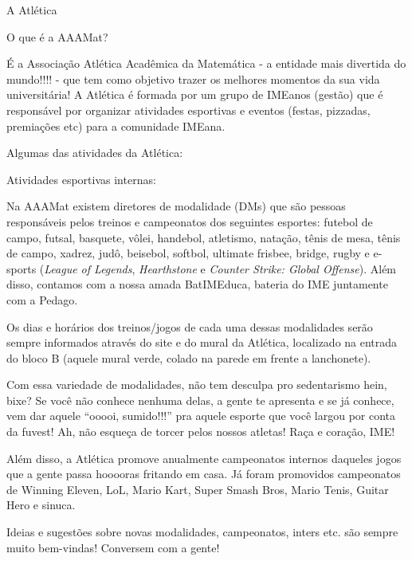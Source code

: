 \begin{secao}{A Atlética} %

\begin{subsecao}{O que é a AAAMat?}

É a Associação Atlética Acadêmica da Matemática - a entidade mais divertida do
mundo!!!! - que tem como objetivo trazer os melhores momentos da sua vida
universitária! A Atlética é formada por um grupo de IMEanos (gestão) que é
responsável por organizar atividades esportivas e eventos (festas, pizzadas,
premiações etc) para a comunidade IMEana.

\end{subsecao}

Algumas das atividades da Atlética:

\begin{subsecao}{Atividades esportivas internas:}

Na AAAMat existem diretores de modalidade (DMs) que são pessoas responsáveis
pelos treinos e campeonatos dos seguintes esportes: futebol de campo, futsal,
basquete, vôlei, handebol, atletismo, natação, tênis de mesa, tênis de campo,
xadrez, judô, beisebol, softbol, ultimate frisbee, bridge, rugby e e-sports
(\textit{League of Legends}, \textit{Hearthstone} e
\textit{Counter Strike: Global Offense}). Além disso, contamos com a nossa 
amada BatIMEduca, bateria do IME juntamente com a Pedago.

Os dias e horários dos treinos/jogos de cada uma dessas modalidades serão
sempre informados através do site e do mural da Atlética, localizado na entrada
do bloco B (aquele mural verde, colado na parede em frente a lanchonete).

Com essa variedade de modalidades, não tem desculpa pro sedentarismo hein,
bixe? Se você não conhece nenhuma delas, a gente te apresenta e se já conhece,
vem dar aquele “ooooi, sumido!!!” pra aquele esporte que você largou por conta
da fuvest! Ah, não esqueça de torcer pelos nossos atletas! Raça e coração, IME!

Além disso, a Atlética promove anualmente campeonatos internos daqueles jogos
que a gente passa hooooras fritando em casa. Já foram promovidos campeonatos de
Winning Eleven, LoL, Mario Kart, Super Smash Bros, Mario Tenis, Guitar Hero e
sinuca.

Ideias e sugestões sobre novas modalidades, campeonatos, inters etc. são
sempre muito bem-vindas! Conversem com a gente!


\end{subsecao}
\end{secao}
